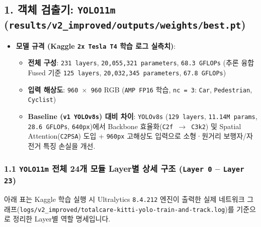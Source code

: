 \documentclass[10.5pt,a4paper]{article}
\begin{document}
\subsection{1. 객체 검출기: \texttt{YOLO11m} (\texttt{results/\allowbreak{}v2\_\allowbreak{}improved/\allowbreak{}outputs/\allowbreak{}weights/\allowbreak{}best.\allowbreak{}pt})}

\begin{itemize}[leftmargin=1.5em,itemsep=2pt]
\item \textbf{모델 규격 (Kaggle \texttt{2x Tesla T4} 학습 로그 실측치)}:
\begin{itemize}[leftmargin=1.5em,itemsep=2pt]
\item \textbf{전체 구성}: \texttt{231 layers}, \texttt{20,\allowbreak{}055,\allowbreak{}321 parameters}, \texttt{68.\allowbreak{}3 GFLOPs} (추론 융합 Fused 기준 \texttt{125 layers}, \texttt{20,\allowbreak{}032,\allowbreak{}345 parameters}, \texttt{67.\allowbreak{}8 GFLOPs})
\item \textbf{입력 해상도}: \texttt{960 $\times$ 960} RGB (\texttt{AMP FP16} 학습, \texttt{nc = 3}: \texttt{Car}, \texttt{Pedestrian}, \texttt{Cyclist})
\item \textbf{Baseline (\texttt{v1 YOLOv8s}) 대비 차이}: \texttt{YOLOv8s} (\texttt{129 layers}, \texttt{11.\allowbreak{}14M params}, \texttt{28.\allowbreak{}6 GFLOPs}, \texttt{640px})에서 Backbone 효율화(\texttt{C2f $\rightarrow$ C3k2}) 및 Spatial Attention(\texttt{C2PSA}) 도입 + \texttt{960px} 고해상도 입력으로 소형·원거리 보행자/자전거 특징 손실을 개선.
\end{itemize}
\end{itemize}

\subsubsection{1.1 \texttt{YOLO11m} 전체 24개 모듈 Layer별 상세 구조 (\texttt{Layer 0} -- \texttt{Layer 23})}

아래 표는 Kaggle 학습 실행 시 Ultralytics \texttt{8.\allowbreak{}4.\allowbreak{}212} 엔진이 출력한 실제 네트워크 그래프(\texttt{logs/\allowbreak{}v2\_\allowbreak{}improved/\allowbreak{}totalcare-\allowbreak{}kitti-\allowbreak{}yolo-\allowbreak{}train-\allowbreak{}and-\allowbreak{}track.\allowbreak{}log})를 기준으로 정리한 Layer별 역할 명세입니다.
\end{document}
